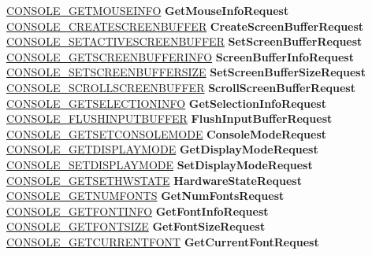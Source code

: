 \begin{DoxyCompactItemize}
\begin{tabbing}
\>\hyperlink{struct___c_o_n_s_o_l_e___g_e_t_m_o_u_s_e_i_n_f_o}{CONSOLE\_GETMOUSEINFO} {\bfseries GetMouseInfoRequest}\\
\>\hyperlink{struct___c_o_n_s_o_l_e___c_r_e_a_t_e_s_c_r_e_e_n_b_u_f_f_e_r}{CONSOLE\_CREATESCREENBUFFER} {\bfseries CreateScreenBufferRequest}\\
\>\hyperlink{struct___c_o_n_s_o_l_e___s_e_t_a_c_t_i_v_e_s_c_r_e_e_n_b_u_f_f_e_r}{CONSOLE\_SETACTIVESCREENBUFFER} {\bfseries SetScreenBufferRequest}\\
\>\hyperlink{struct___c_o_n_s_o_l_e___g_e_t_s_c_r_e_e_n_b_u_f_f_e_r_i_n_f_o}{CONSOLE\_GETSCREENBUFFERINFO} {\bfseries ScreenBufferInfoRequest}\\
\>\hyperlink{struct___c_o_n_s_o_l_e___s_e_t_s_c_r_e_e_n_b_u_f_f_e_r_s_i_z_e}{CONSOLE\_SETSCREENBUFFERSIZE} {\bfseries SetScreenBufferSizeRequest}\\
\>\hyperlink{struct___c_o_n_s_o_l_e___s_c_r_o_l_l_s_c_r_e_e_n_b_u_f_f_e_r}{CONSOLE\_SCROLLSCREENBUFFER} {\bfseries ScrollScreenBufferRequest}\\
\>\hyperlink{struct___c_o_n_s_o_l_e___g_e_t_s_e_l_e_c_t_i_o_n_i_n_f_o}{CONSOLE\_GETSELECTIONINFO} {\bfseries GetSelectionInfoRequest}\\
\>\hyperlink{struct___c_o_n_s_o_l_e___f_l_u_s_h_i_n_p_u_t_b_u_f_f_e_r}{CONSOLE\_FLUSHINPUTBUFFER} {\bfseries FlushInputBufferRequest}\\
\>\hyperlink{struct___c_o_n_s_o_l_e___g_e_t_s_e_t_c_o_n_s_o_l_e_m_o_d_e}{CONSOLE\_GETSETCONSOLEMODE} {\bfseries ConsoleModeRequest}\\
\>\hyperlink{struct___c_o_n_s_o_l_e___g_e_t_d_i_s_p_l_a_y_m_o_d_e}{CONSOLE\_GETDISPLAYMODE} {\bfseries GetDisplayModeRequest}\\
\>\hyperlink{struct___c_o_n_s_o_l_e___s_e_t_d_i_s_p_l_a_y_m_o_d_e}{CONSOLE\_SETDISPLAYMODE} {\bfseries SetDisplayModeRequest}\\
\>\hyperlink{struct___c_o_n_s_o_l_e___g_e_t_s_e_t_h_w_s_t_a_t_e}{CONSOLE\_GETSETHWSTATE} {\bfseries HardwareStateRequest}\\
\>\hyperlink{struct___c_o_n_s_o_l_e___g_e_t_n_u_m_f_o_n_t_s}{CONSOLE\_GETNUMFONTS} {\bfseries GetNumFontsRequest}\\
\>\hyperlink{struct___c_o_n_s_o_l_e___g_e_t_f_o_n_t_i_n_f_o}{CONSOLE\_GETFONTINFO} {\bfseries GetFontInfoRequest}\\
\>\hyperlink{struct___c_o_n_s_o_l_e___g_e_t_f_o_n_t_s_i_z_e}{CONSOLE\_GETFONTSIZE} {\bfseries GetFontSizeRequest}\\
\>\hyperlink{struct___c_o_n_s_o_l_e___g_e_t_c_u_r_r_e_n_t_f_o_n_t}{CONSOLE\_GETCURRENTFONT} {\bfseries GetCurrentFontRequest}\\

\end{tabbing}
\end{DoxyCompactItemize}
